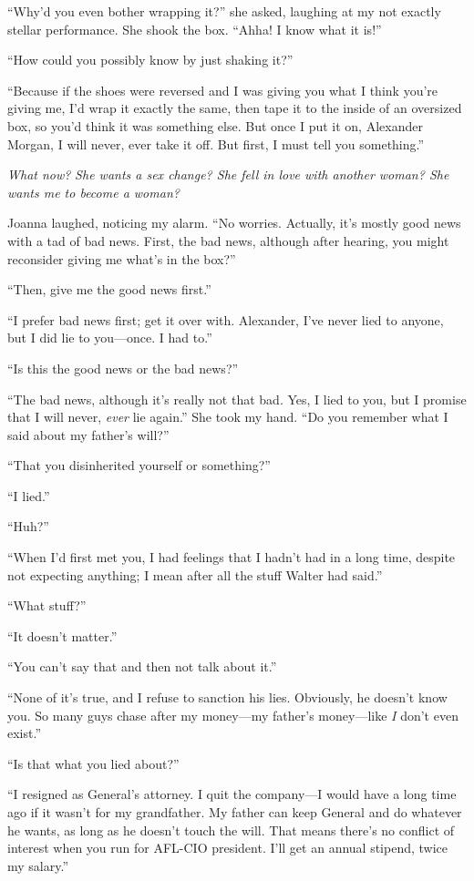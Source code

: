 ``Why'd you even bother wrapping it?'' she asked, laughing at my not
exactly stellar performance. She shook the box. ``Ahha! I know what it
is!''

``How could you possibly know by just shaking it?''

``Because if the shoes were reversed and I was giving you what I think
you're giving me, I'd wrap it exactly the same, then tape it to the
inside of an oversized box, so you'd think it was something else. But
once I put it on, Alexander Morgan, I will never, ever take it off. But
first, I must tell you something.''

\emph{What now?} \emph{She wants a sex change? She fell in love with
another woman? She wants me to become a woman?}

Joanna laughed, noticing my alarm. ``No worries. Actually, it's mostly
good news with a tad of bad news. First, the bad news, although after
hearing, you might reconsider giving me what's in the box?''

``Then, give me the good news first.''

``I prefer bad news first; get it over with. Alexander, I've never lied
to anyone, but I did lie to you---once. I had to.''

``Is this the good news or the bad news?''

``The bad news, although it's really not that bad. Yes, I lied to you,
but I promise that I will never, \emph{ever} lie again.'' She took my
hand. ``Do you remember what I said about my father's will?''

``That you disinherited yourself or something?''

``I lied.''

``Huh?''

``When I'd first met you, I had feelings that I hadn't had in a long
time, despite not expecting anything; I mean after all the stuff Walter
had said.''

``What stuff?''

``It doesn't matter.''

``You can't say that and then not talk about it.''

``None of it's true, and I refuse to sanction his lies. Obviously, he
doesn't know you. So many guys chase after my money---my father's
money---like \emph{I} don't even exist.''

``Is that what you lied about?''

``I resigned as General's attorney. I quit the company---I would have a
long time ago if it wasn't for my grandfather. My father can keep
General and do whatever he wants, as long as he doesn't touch the will.
That means there's no conflict of interest when you run for AFL-CIO
president. I'll get an annual stipend, twice my salary.''

